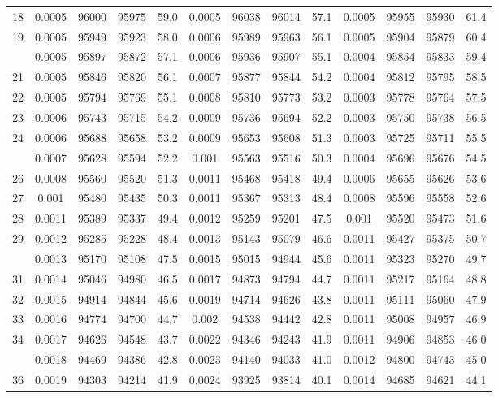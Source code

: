 \documentclass[
  14pt,
]{article}
\begin{document}
\begin{longtable}[t]{lcccccccccccc}
18 & 0.0005 & 96000 & 95975 & 59.0 & 0.0005 & 96038 & 96014 & 57.1 & 0.0005 & 95955 & 95930 & 61.4\\
19 & 0.0005 & 95949 & 95923 & 58.0 & 0.0006 & 95989 & 95963 & 56.1 & 0.0005 & 95904 & 95879 & 60.4\\
\addlinespace
20 & 0.0005 & 95897 & 95872 & 57.1 & 0.0006 & 95936 & 95907 & 55.1 & 0.0004 & 95854 & 95833 & 59.4\\
21 & 0.0005 & 95846 & 95820 & 56.1 & 0.0007 & 95877 & 95844 & 54.2 & 0.0004 & 95812 & 95795 & 58.5\\
22 & 0.0005 & 95794 & 95769 & 55.1 & 0.0008 & 95810 & 95773 & 53.2 & 0.0003 & 95778 & 95764 & 57.5\\
23 & 0.0006 & 95743 & 95715 & 54.2 & 0.0009 & 95736 & 95694 & 52.2 & 0.0003 & 95750 & 95738 & 56.5\\
24 & 0.0006 & 95688 & 95658 & 53.2 & 0.0009 & 95653 & 95608 & 51.3 & 0.0003 & 95725 & 95711 & 55.5\\
\addlinespace
25 & 0.0007 & 95628 & 95594 & 52.2 & 0.001 & 95563 & 95516 & 50.3 & 0.0004 & 95696 & 95676 & 54.5\\
26 & 0.0008 & 95560 & 95520 & 51.3 & 0.0011 & 95468 & 95418 & 49.4 & 0.0006 & 95655 & 95626 & 53.6\\
27 & 0.001 & 95480 & 95435 & 50.3 & 0.0011 & 95367 & 95313 & 48.4 & 0.0008 & 95596 & 95558 & 52.6\\
28 & 0.0011 & 95389 & 95337 & 49.4 & 0.0012 & 95259 & 95201 & 47.5 & 0.001 & 95520 & 95473 & 51.6\\
29 & 0.0012 & 95285 & 95228 & 48.4 & 0.0013 & 95143 & 95079 & 46.6 & 0.0011 & 95427 & 95375 & 50.7\\
\addlinespace
30 & 0.0013 & 95170 & 95108 & 47.5 & 0.0015 & 95015 & 94944 & 45.6 & 0.0011 & 95323 & 95270 & 49.7\\
31 & 0.0014 & 95046 & 94980 & 46.5 & 0.0017 & 94873 & 94794 & 44.7 & 0.0011 & 95217 & 95164 & 48.8\\
32 & 0.0015 & 94914 & 94844 & 45.6 & 0.0019 & 94714 & 94626 & 43.8 & 0.0011 & 95111 & 95060 & 47.9\\
33 & 0.0016 & 94774 & 94700 & 44.7 & 0.002 & 94538 & 94442 & 42.8 & 0.0011 & 95008 & 94957 & 46.9\\
34 & 0.0017 & 94626 & 94548 & 43.7 & 0.0022 & 94346 & 94243 & 41.9 & 0.0011 & 94906 & 94853 & 46.0\\
\addlinespace
35 & 0.0018 & 94469 & 94386 & 42.8 & 0.0023 & 94140 & 94033 & 41.0 & 0.0012 & 94800 & 94743 & 45.0\\
36 & 0.0019 & 94303 & 94214 & 41.9 & 0.0024 & 93925 & 93814 & 40.1 & 0.0014 & 94685 & 94621 & 44.1\\

\end{longtable}
\end{document}
